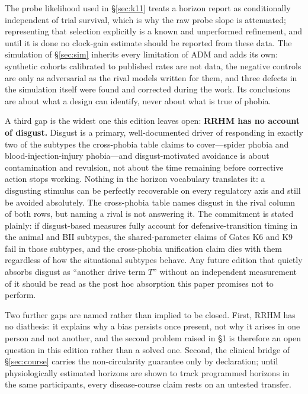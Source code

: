 \documentclass[9pt,twocolumn]{article}
\begin{document}
The probe likelihood used in \S\ref{sec:k11} treats a horizon report as conditionally independent of trial survival, which is why the raw probe slope is attenuated; representing that selection explicitly is a known and unperformed refinement, and until it is done no clock-gain estimate should be reported from these data. The simulation of \S\ref{sec:sim} inherits every limitation of ADM and adds its own: synthetic cohorts calibrated to published rates are not data, the negative controls are only as adversarial as the rival models written for them, and three defects in the simulation itself were found and corrected during the work. Its conclusions are about what a design can identify, never about what is true of phobia.

A third gap is the widest one this edition leaves open: \textbf{RRHM has no account of disgust.} Disgust is a primary, well-documented driver of responding in exactly two of the subtypes the cross-phobia table claims to cover---spider phobia and blood-injection-injury phobia---and disgust-motivated avoidance is about contamination and revulsion, not about the time remaining before corrective action stops working. Nothing in the horizon vocabulary translates it: a disgusting stimulus can be perfectly recoverable on every regulatory axis and still be avoided absolutely. The cross-phobia table names disgust in the rival column of both rows, but naming a rival is not answering it. The commitment is stated plainly: if disgust-based measures fully account for defensive-transition timing in the animal and BII subtypes, the shared-parameter claims of Gates K6 and K9 fail in those subtypes, and the cross-phobia unification claim dies with them regardless of how the situational subtypes behave. Any future edition that quietly absorbs disgust as ``another drive term $T$'' without an independent measurement of it should be read as the post hoc absorption this paper promises not to perform.

Two further gaps are named rather than implied to be closed. First, RRHM has no diathesis: it explains why a bias persists once present, not why it arises in one person and not another, and the second problem raised in \S1 is therefore an open question in this edition rather than a solved one. Second, the clinical bridge of \S\ref{sec:course} carries the non-circularity guarantee only by declaration; until physiologically estimated horizons are shown to track programmed horizons in the same participants, every disease-course claim rests on an untested transfer.
\end{document}
